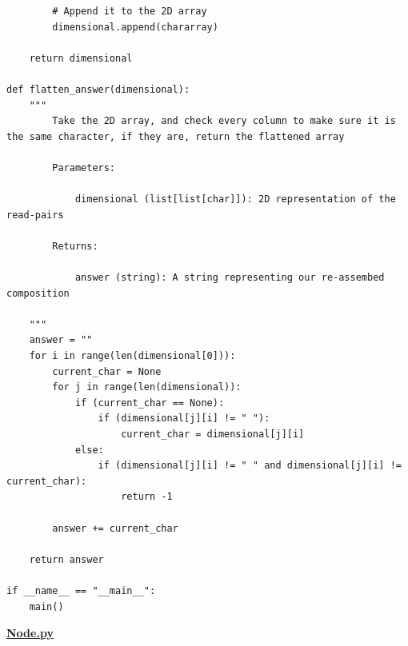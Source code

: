 \documentclass{article}
\begin{document}
\begin{lstlisting}
        # Append it to the 2D array
        dimensional.append(chararray)

    return dimensional

def flatten_answer(dimensional):
    """
        Take the 2D array, and check every column to make sure it is the same character, if they are, return the flattened array

        Parameters:

            dimensional (list[list[char]]): 2D representation of the read-pairs

        Returns:

            answer (string): A string representing our re-assembed composition
    
    """
    answer = ""
    for i in range(len(dimensional[0])):
        current_char = None
        for j in range(len(dimensional)):
            if (current_char == None):
                if (dimensional[j][i] != " "):
                    current_char = dimensional[j][i]
            else:
                if (dimensional[j][i] != " " and dimensional[j][i] != current_char):
                    return -1

        answer += current_char

    return answer

if __name__ == "__main__":
    main()

\end{lstlisting}
\textbf{\underline{Node.py}}
\end{document}
